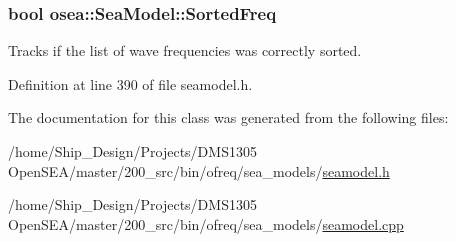 \hypertarget{classosea_1_1_sea_model_a55ba1a3f8d242b4c5c78a5613101dd6f}{
\subsubsection[{Sorted\-Freq}]{\setlength{\rightskip}{0pt plus 5cm}bool osea\-::\-Sea\-Model\-::\-Sorted\-Freq\hspace{0.3cm}{\ttfamily [protected]}}}\label{classosea_1_1_sea_model_a55ba1a3f8d242b4c5c78a5613101dd6f}


Tracks if the list of wave frequencies was correctly sorted. 



Definition at line 390 of file seamodel.\-h.



The documentation for this class was generated from the following files\-:\begin{DoxyCompactItemize}
\item 
/home/\-Ship\-\_\-\-Design/\-Projects/\-D\-M\-S1305 Open\-S\-E\-A/master/200\-\_\-src/bin/ofreq/sea\-\_\-models/\hyperlink{seamodel_8h}{seamodel.\-h}\item 
/home/\-Ship\-\_\-\-Design/\-Projects/\-D\-M\-S1305 Open\-S\-E\-A/master/200\-\_\-src/bin/ofreq/sea\-\_\-models/\hyperlink{seamodel_8cpp}{seamodel.\-cpp}\end{DoxyCompactItemize}
